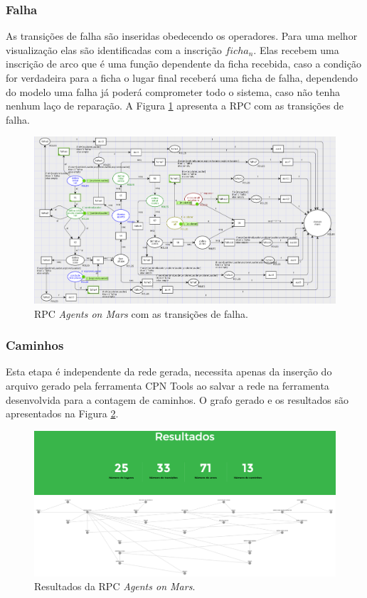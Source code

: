 \subsubsection{Falha}

As transições de falha são inseridas obedecendo os operadores. Para uma melhor visualização elas são identificadas com a inscrição $ficha_{n}$. Elas recebem uma inscrição de arco que é uma função dependente da ficha recebida, caso a condição for verdadeira para a ficha o lugar final receberá uma ficha de falha, dependendo do modelo uma falha já poderá comprometer todo o sistema, caso não tenha nenhum laço de reparação. A Figura \ref{fig:5-rpc-final2} apresenta a RPC com as transições de falha.

\begin{figure}
\centering
\includegraphics[scale=0.55]{imagens/5-implementacao2OK.png}
\caption{RPC \textit{Agents on Mars} com as transições de falha.}
\label{fig:5-rpc-final2}
\end{figure}

\subsubsection{Caminhos}
Esta etapa é independente da rede gerada, necessita apenas da inserção do arquivo gerado pela ferramenta CPN Tools ao salvar a rede na ferramenta desenvolvida para a contagem de caminhos. O grafo gerado e os resultados são apresentados na Figura \ref{fig:5-resultado2}.

\begin{figure}[ht]
\centering
\includegraphics[scale=0.28]{imagens/5-resultado2.png}
\caption{Resultados da RPC \textit{Agents on Mars}.}
\label{fig:5-resultado2}
\end{figure}




